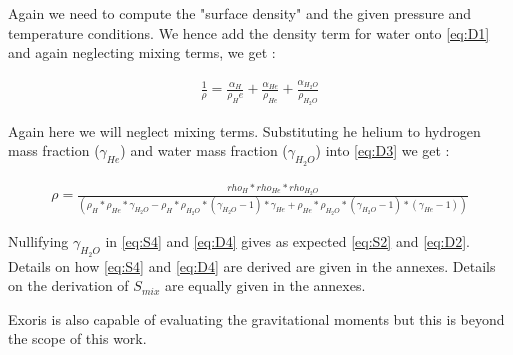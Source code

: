 Again we need to compute the "surface density" and the given pressure and temperature conditions. We hence add the density term for water onto \cref{eq:D1} and again neglecting mixing terms, we get :

\begin{align}
    \frac{1}{\rho} = \frac{\alpha_H}{\rho_He} +  \frac{\alpha_{He}}{\rho_{He}} +  \frac{\alpha_{H_2O}}{\rho_{H_2O}} \label{eq:D3}
\end{align}

Again here we will neglect mixing terms. Substituting he helium to hydrogen mass fraction ($\gamma_{He}$) and water mass fraction ($\gamma_{H_2O}$) into \cref{eq:D3} we get : 

\begin{align}
    \rho = \frac{rho_H*rho_{He}*rho_{H_2O}}{(\rho_H*\rho_{He}*\gamma_{H_2O}-\rho_H*\rho_{H_2O}*(\gamma_{H_2O}-1)*\gamma_{He}+\rho_{He}*\rho_{H_2O}*(\gamma_{H_2O}-1)*(\gamma_{He}-1))} \label{eq:D4}
\end{align}

Nullifying $\gamma_{H_2O}$ in \cref{eq:S4} and \cref{eq:D4} gives as expected \cref{eq:S2} and \cref{eq:D2}. Details on how \cref{eq:S4} and \cref{eq:D4} are derived are given in the annexes. Details on the derivation of $S_{mix}$ are equally given in the annexes.

Exoris is also capable of evaluating the gravitational moments but this is beyond the scope of this work.
